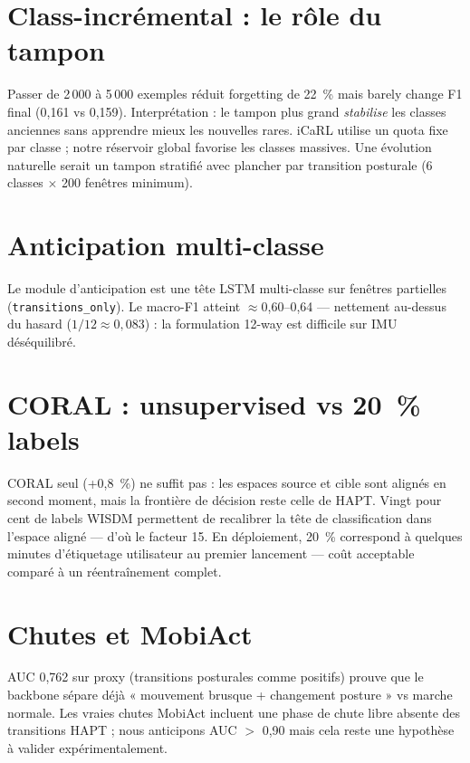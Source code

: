 \documentclass[a4paper,12pt]{report}
\begin{document}
\section{Class-incrémental : le rôle du tampon}

Passer de 2\,000 à 5\,000 exemples réduit forgetting de 22~\% mais barely change
F1 final (0,161 vs 0,159). Interprétation : le tampon plus grand \emph{stabilise}
les classes anciennes sans apprendre mieux les nouvelles rares. iCaRL utilise un
quota fixe par classe ; notre réservoir global favorise les classes massives.
Une évolution naturelle serait un tampon stratifié avec plancher par transition
posturale (6 classes $\times$ 200 fenêtres minimum).

\section{Anticipation multi-classe}

Le module d'anticipation est une tête LSTM multi-classe sur fenêtres partielles
(\texttt{transitions\_only}). Le macro-F1 atteint $\approx$0,60--0,64 — nettement au-dessus du
hasard ($1/12 \approx 0{,}083$) : la formulation 12-way est difficile sur IMU
déséquilibré.

\section{CORAL : unsupervised vs 20~\% labels}

CORAL seul (+0,8~\%) ne suffit pas : les espaces source et cible sont alignés
en second moment, mais la frontière de décision reste celle de HAPT. Vingt pour
cent de labels WISDM permettent de recalibrer la tête de classification dans
l'espace aligné — d'où le facteur 15. En déploiement, 20~\% correspond à
quelques minutes d'étiquetage utilisateur au premier lancement — coût acceptable
comparé à un réentraînement complet.

\section{Chutes et MobiAct}

AUC 0,762 sur proxy (transitions posturales comme positifs) prouve que le
backbone sépare déjà « mouvement brusque + changement posture » vs marche
normale. Les vraies chutes MobiAct incluent une phase de chute libre absente
des transitions HAPT ; nous anticipons AUC $>$ 0,90 mais cela reste une
hypothèse à valider expérimentalement.
\end{document}
